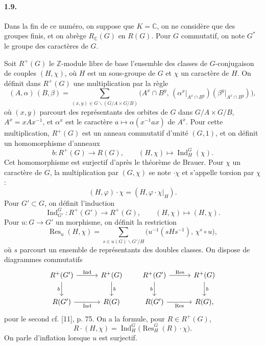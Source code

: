 \documentclass[10pt]{article}
\newcommand{\C}{\mathbb C}
\newcommand{\Z}{\mathbb Z}
\newcommand{\Ind}{\operatorname{Ind}}
\newcommand{\Res}{\operatorname{Res}}
\begin{document}
\paragraph{1.9.} Dans la fin de ce numéro, on suppose que \(K=\C\), on ne considère que des groupes finis, et on abrège \(R_\C(G)\) en \(R(G)\). Pour \(G\) commutatif, on note \(G^*\) le groupe des caractères de \(G\).

Soit \(R^+(G)\) le \(\Z\)-module libre de base l'ensemble des classes de \(G\)-conjugaison de couples \((H,\chi)\), où \(H\) est un sous-groupe de \(G\) et \(\chi\) un caractère de \(H\). On définit dans \(R^+(G)\) une multiplication par la règle
\[
\tag{1.9.1}
(A,\alpha)\,(B,\beta)=
\sum_{(x,y)\in G\backslash(G/A\times G/B)}
\bigl(A^x\cap B^y,\,
(\alpha^x|_{A^x\cap B^y})(\beta^y|_{A^x\cap B^y})\bigr),
\]
où \((x,y)\) parcourt des représentants des orbites de \(G\) dans \(G/A\times G/B\), \(A^x=xAx^{-1}\), et \(\alpha^x\) est le caractère \(a\mapsto \alpha(x^{-1}ax)\) de \(A^x\). Pour cette multiplication, \(R^+(G)\) est un anneau commutatif d'unité \((G,1)\), et on définit un homomorphisme d'anneaux
\[
\tag{1.9.2}
b:R^+(G)\longrightarrow R(G),\qquad (H,\chi)\longmapsto \Ind_H^G(\chi).
\]
Cet homomorphisme est surjectif d'après le théorème de Brauer. Pour \(\chi\) un caractère de \(G\), la multiplication par \((G,\chi)\) se note \(\cdot\chi\) et s'appelle torsion par \(\chi\):
\[
\tag{1.9.3}
(H,\varphi)\cdot\chi=(H,\varphi\cdot\chi|_H).
\]
Pour \(G'\subset G\), on définit l'induction
\[
\tag{1.9.4}
\Ind_{G'}^G:R^+(G')\longrightarrow R^+(G),\qquad (H,\chi)\longmapsto(H,\chi).
\]
Pour \(u:G\to G'\) un morphisme, on définit la restriction
\[
\tag{1.9.5}
\Res_u(H,\chi)=
\sum_{s\in u(G)\backslash G'/H}
\bigl(u^{-1}(sHs^{-1}),\,\chi^s\circ u\bigr),
\]
où \(s\) parcourt un ensemble de représentants des doubles classes. On dispose de diagrammes commutatifs
\[
\begin{tikzcd}[column sep=3.0em,row sep=2.0em]
R^+(G') \arrow[r,"\Ind"] \arrow[d,"b"'] & R^+(G) \arrow[d,"b"]\\
R(G') \arrow[r,"\Ind"'] & R(G)
\end{tikzcd}
\qquad
\begin{tikzcd}[column sep=3.0em,row sep=2.0em]
R^+(G') \arrow[r,"\Res"] \arrow[d,"b"'] & R^+(G) \arrow[d,"b"]\\
R(G') \arrow[r,"\Res"'] & R(G),
\end{tikzcd}
\]
pour le second cf. [11], p. 75. On a la formule, pour \(R\in R^+(G)\),
\[
\tag{1.9.6}
R\cdot(H,\chi)=\Ind_H^G\bigl(\Res_H^G(R)\cdot\chi\bigr).
\]
On parle d'inflation lorsque \(u\) est surjectif.
\end{document}
